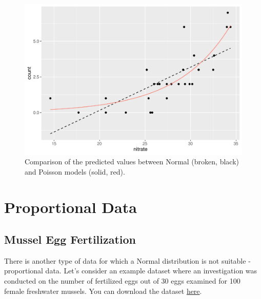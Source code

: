 \documentclass[
]{book}
\begin{document}
\begin{figure}

{\centering \includegraphics{_main_files/figure-latex/normal-pois-1} 

}

\caption{Comparison of the predicted values between Normal (broken, black) and Poisson models (solid, red).}\label{fig:normal-pois}
\end{figure}

\hypertarget{proportional-data}{%
\section{Proportional Data}\label{proportional-data}}

\hypertarget{mussel-egg-fertilization}{%
\subsection{Mussel Egg Fertilization}\label{mussel-egg-fertilization}}

There is another type of data for which a Normal distribution is not suitable - proportional data. Let's consider an example dataset where an investigation was conducted on the number of fertilized eggs out of 30 eggs examined for 100 female freshwater mussels. You can download the dataset \href{https://github.com/aterui/biostats/blob/master/data_raw/data_mussel.csv}{here}.
\end{document}
